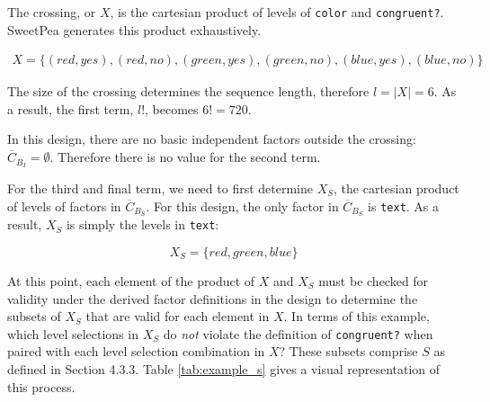 The crossing, or $X$, is the cartesian product of levels of \texttt{color} and \texttt{congruent?}. SweetPea generates this product exhaustively.

\begin{align*}
X = \{(red, yes), (red, no), (green, yes), (green, no), (blue, yes), (blue, no)\}
\end{align*}

The size of the crossing determines the sequence length, therefore $l = |X| = 6$. As a result, the first term, $l!$, becomes $6! = 720$.

In this design, there are no basic independent factors outside the crossing: $\overline{C}_{B_I} = \emptyset$. Therefore there is no value for the second term.

For the third and final term, we need to first determine $X_S$, the cartesian product of levels of factors in $\overline{C}_{B_S}$. For this design, the only factor in $\overline{C}_{B_S}$ is \texttt{text}. As a result, $X_S$ is simply the levels in \texttt{text}:

\[
X_S = \{red, green, blue\}
\]

At this point, each element of the product of $X$ and $X_S$ must be checked for validity under the derived factor definitions in the design to determine the subsets of $X_S$ that are valid for each element in $X$. In terms of this example, which level selections in $X_S$ do \textit{not} violate the definition of \texttt{congruent?} when paired with each level selection combination in $X$? These subsets comprise $S$ as defined in Section 4.3.3. Table \ref{tab:example_s} gives a visual representation of this process.

